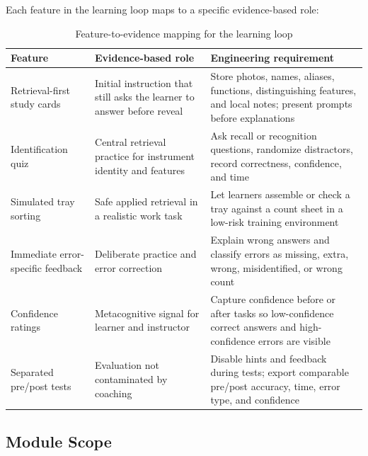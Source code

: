 \documentclass[10pt,a4paper]{article}
\begin{document}
Each feature in the learning loop maps to a specific evidence-based role:
\begin{table}[H]
\centering
\caption{Feature-to-evidence mapping for the learning loop}
\label{tab:feature-to-evidence-mapping-for-the-learning-loop}
\small\renewcommand{\arraystretch}{1.2}\setlength{\tabcolsep}{4pt}
\begin{tabularx}{\textwidth}{|>{\raggedright\arraybackslash}X|>{\raggedright\arraybackslash}X|>{\raggedright\arraybackslash}X|}
\hline
Feature & Evidence-based role & Engineering requirement \\
\hline
Retrieval-first study cards & Initial instruction that still asks the learner to answer before reveal & Store photos, names, aliases, functions, distinguishing features, and local notes; present prompts before explanations \\
\hline
Identification quiz & Central retrieval practice for instrument identity and features & Ask recall or recognition questions, randomize distractors, record correctness, confidence, and time \\
\hline
Simulated tray sorting & Safe applied retrieval in a realistic work task & Let learners assemble or check a tray against a count sheet in a low-risk training environment \\
\hline
Immediate error-specific feedback & Deliberate practice and error correction & Explain wrong answers and classify errors as missing, extra, wrong, misidentified, or wrong count \\
\hline
Confidence ratings & Metacognitive signal for learner and instructor & Capture confidence before or after tasks so low-confidence correct answers and high-confidence errors are visible \\
\hline
Separated pre/post tests & Evaluation not contaminated by coaching & Disable hints and feedback during tests; export comparable pre/post accuracy, time, error type, and confidence \\
\hline
\end{tabularx}
\end{table}
\subsection{Module Scope}
\end{document}
